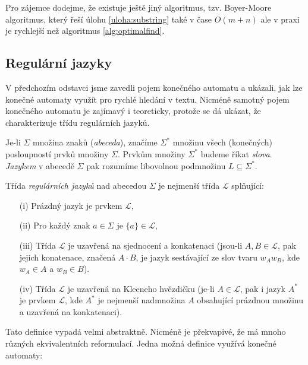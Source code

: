 
Pro zájemce dodejme, že existuje ještě jiný algoritmus, tzv. Boyer-Moore algoritmus,
který řeší úlohu \ref{uloha:substring} také v čase \(O(m+n)\) ale v praxi je rychlejší než
algoritmus \ref{alg:optimalfind}.

\subsection*{Regulární jazyky}

V předchozím odstavci jsme zavedli pojem konečného automatu a ukázali, jak lze konečné
automaty využít pro rychlé hledání v textu. Nicméně samotný pojem konečného automatu
je zajímavý i teoreticky, protože se dá ukázat, že charakterizuje třídu regulárních jazyků.

\begin{definition} Je-li \(\Sigma\) množina znaků (\emph{abeceda}), značíme \(\Sigma^*\) množinu všech
(konečných) posloupností prvků množiny \(\Sigma\). Prvkům množiny \(\Sigma^*\) budeme říkat
\emph{slova}.  \emph{Jazykem} v abecedě \(\Sigma\) pak rozumíme libovolnou podmnožinu \(L\subseteq\Sigma^*\).
\end{definition}

\begin{definition}  Třída \emph{regulárních jazyků} nad abecedou \(\Sigma\) je nejmenší třída \(\mathcal L\) splňující:
\begin{itemize}
  \item[(i)] Prázdný jazyk je prvkem \(\mathcal L\),
 \item[(ii)] Pro každý znak \(a\in\Sigma\) je \(\{a\}\in\mathcal L\),
 \item[(iii)] Třída \(\mathcal L\) je uzavřená na sjednocení a konkatenaci (jsou-li \(A,B\in\mathcal L\), pak jejich konatenace,
                     značená \(A\cdot B\), je jazyk sestávající ze slov tvaru \(w_Aw_B\), kde \(w_A\in A\) a \(w_B\in B\)).
 \item[(iv)] Třída \(\mathcal L\) je uzavřená na Kleeneho hvězdičku (je-li \(A\in\mathcal L\), pak i jazyk \(A^*\) je prvkem
                     \(\mathcal L\), kde \(A^*\) je nejmenší nadmnožina \(A\) obsahující prázdnou množinu a uzavřená na konkatenaci).
\end{itemize}
\end{definition}

Tato definice vypadá velmi abstraktně. Nicméně je překvapivé, že má mnoho různých ekvivalentních reformulací.
Jedna možná definice využívá konečné automaty:

